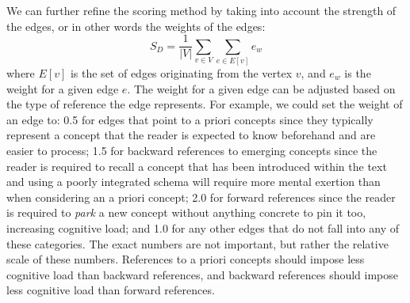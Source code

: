 \documentclass[12pt]{article}
\theoremstyle{grammarstyle}
\begin{document}
We can further refine the scoring method by taking into account the strength of the edges, or in other words the weights of the edges:
\begin{equation} \label{eq:weighed score}
    S_D = \frac{1}{|V|} \sum_{v \in V} \sum_{e \in E[v]} e_w
\end{equation}
where $E[v]$ is the set of edges originating from the vertex $v$, and $e_w$ is the weight for a given edge $e$. 
The weight for a given edge can be adjusted based on the type of reference the edge represents. For example, we could set the weight of an edge to: 0.5 for edges that point to a priori concepts since they typically represent a concept that the reader is expected to know beforehand and are easier to process; 1.5 for backward references to emerging concepts since the reader is required to recall a concept that has been introduced within the text and using a poorly integrated schema will require more mental exertion than when considering an a priori concept; 2.0 for forward references since the reader is required to \textit{park} a new concept without anything concrete to pin it too, increasing cognitive load; and 1.0 for any other edges that do not fall into any of these categories. The exact numbers are not important, but rather the relative scale of these numbers. References to a priori concepts should impose less cognitive load than backward references, and backward references should impose less cognitive load than forward references.
\end{document}
